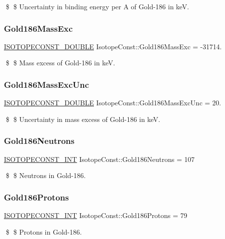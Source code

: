 \$ \$ Uncertainty in binding energy per A of Gold-\/186 in keV. \mbox{\label{group___isotope_const-_gold-_au186_ga91d5cde5709796de93050cc4f9f4c274}} 
\subsubsection{\texorpdfstring{Gold186\+Mass\+Exc}{Gold186MassExc}}
{\footnotesize\ttfamily \mbox{\hyperlink{group___isotope_const-_macros_ga8f45a7272ce02c0b4c65c44636ed719a}{I\+S\+O\+T\+O\+P\+E\+C\+O\+N\+S\+T\+\_\+\+D\+O\+U\+B\+LE}} Isotope\+Const\+::\+Gold186\+Mass\+Exc = -\/31714.}

\$ \$ Mass excess of Gold-\/186 in keV. \mbox{\label{group___isotope_const-_gold-_au186_ga84b4cf132c0085fc555ce2b4716ac4af}} 
\subsubsection{\texorpdfstring{Gold186\+Mass\+Exc\+Unc}{Gold186MassExcUnc}}
{\footnotesize\ttfamily \mbox{\hyperlink{group___isotope_const-_macros_ga8f45a7272ce02c0b4c65c44636ed719a}{I\+S\+O\+T\+O\+P\+E\+C\+O\+N\+S\+T\+\_\+\+D\+O\+U\+B\+LE}} Isotope\+Const\+::\+Gold186\+Mass\+Exc\+Unc = 20.}

\$ \$ Uncertainty in mass excess of Gold-\/186 in keV. \mbox{\label{group___isotope_const-_gold-_au186_ga75c93f8ca1e9ee3bcd3e16854a90b66a}} 
\subsubsection{\texorpdfstring{Gold186\+Neutrons}{Gold186Neutrons}}
{\footnotesize\ttfamily \mbox{\hyperlink{group___isotope_const-_macros_ga5f18360b3e99483a35c32d789e62621c}{I\+S\+O\+T\+O\+P\+E\+C\+O\+N\+S\+T\+\_\+\+I\+NT}} Isotope\+Const\+::\+Gold186\+Neutrons = 107}

\$ \$ Neutrons in Gold-\/186. \mbox{\label{group___isotope_const-_gold-_au186_ga8193f09f30eb39b1f200f865ff0fc4d9}} 
\subsubsection{\texorpdfstring{Gold186\+Protons}{Gold186Protons}}
{\footnotesize\ttfamily \mbox{\hyperlink{group___isotope_const-_macros_ga5f18360b3e99483a35c32d789e62621c}{I\+S\+O\+T\+O\+P\+E\+C\+O\+N\+S\+T\+\_\+\+I\+NT}} Isotope\+Const\+::\+Gold186\+Protons = 79}

\$ \$ Protons in Gold-\/186. 